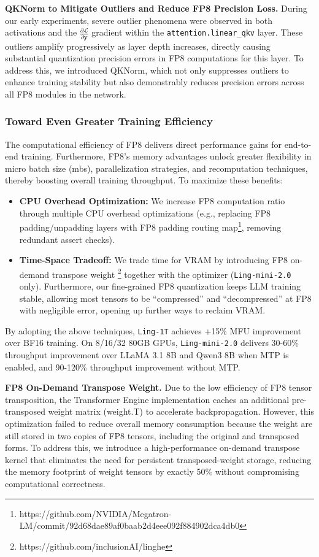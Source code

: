 \documentclass[table]{gtech}
\theoremstyle{definition}
\newcommand{\paratitle}[1]{\vspace{1.5ex}\noindent\textbf{#1}}
\begin{document}
\paratitle{QKNorm to Mitigate Outliers and Reduce FP8 Precision Loss.}
During our early experiments, severe outlier phenomena were observed in both activations and the $\frac{\partial \mathcal{L}}{\partial \mathbf{y}}$ gradient within the \texttt{attention.linear\_qkv} layer. 
These outliers amplify progressively as layer depth increases, directly causing substantial quantization precision errors in FP8 computations for this layer. 
To address this, we introduced QKNorm, which not only suppresses outliers to enhance training stability but also demonstrably reduces precision errors across all FP8 modules in the network.

\subsubsection{Toward Even Greater Training Efficiency}

The computational efficiency of FP8 delivers direct performance gains for end-to-end training. Furthermore, FP8's memory advantages unlock greater flexibility in micro batch size (mbs), parallelization strategies, and recomputation techniques, thereby boosting overall training throughput. To maximize these benefits:
\begin{itemize}[leftmargin=1.5em]
    \item \textbf{CPU Overhead Optimization:} We increase FP8 computation ratio through multiple CPU overhead optimizations (e.g., replacing FP8 padding/unpadding layers with FP8 padding routing map\footnote{https://github.com/NVIDIA/Megatron-LM/commit/92d68dae89af0baab2d4eee092f884902dca4db0}, removing redundant assert checks).
    \item \textbf{Time-Space Tradeoff:} We trade time for VRAM by introducing FP8 on-demand transpose weight \footnote{https://github.com/inclusionAI/linghe} together with the optimizer (\texttt{Ling-mini-2.0} only). Furthermore, our fine-grained FP8 quantization keeps LLM training stable, allowing most tensors to be ``compressed'' and ``decompressed'' at FP8 with negligible error, opening up further ways to reclaim VRAM.
\end{itemize}
By adopting the above techniques, \texttt{Ling-1T} achieves +15\% MFU improvement over BF16 training. On 8/16/32 80GB GPUs, \texttt{Ling-mini-2.0} delivers 30-60\% throughput improvement over LLaMA 3.1 8B and Qwen3 8B when MTP is enabled, and 90-120\% throughput improvement without MTP.

\paratitle{FP8 On-Demand Transpose Weight.}
Due to the low efficiency of FP8 tensor transposition, the Transformer Engine implementation caches an additional pre-transposed weight matrix (weight.T) to accelerate backpropagation. However, this optimization failed to reduce overall memory consumption because the weight are still stored in two copies of FP8 tensors, including the original and transposed forms. To address this, we introduce a high-performance on-demand transpose kernel that eliminates the need for persistent transposed-weight storage, reducing the memory footprint of weight tensors by exactly 50\% without compromising computational correctness.
\end{document}
